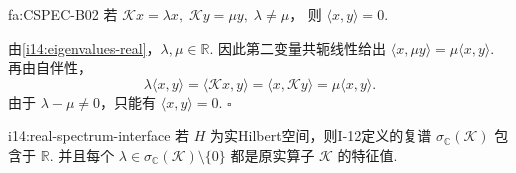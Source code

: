 \begin{FATheorem}[B][紧自伴特征向量正交性]{fa:CSPEC-B02}
若
\(\displaystyle \mathcal Kx=\lambda x, \; \mathcal Ky=\mu y, \; \lambda\neq\mu\)，
则 \(\displaystyle \langle x,y\rangle=0\).
\end{FATheorem}

\begin{FAProof}
由\autoref{i14:eigenvalues-real}，\(\displaystyle \lambda,\mu\in\mathbb R\). 因此第二变量共轭线性给出 \(\displaystyle \langle x,\mu y\rangle=\mu\langle x,y\rangle\). 再由自伴性，
\[
\lambda\langle x,y\rangle
=
\langle\mathcal Kx,y\rangle
=
\langle x,\mathcal Ky\rangle
=
\mu\langle x,y\rangle.
\]
由于 \(\displaystyle \lambda-\mu\neq0\)，只能有 \(\displaystyle \langle x,y\rangle=0\).
\hfill\(\square\)
\end{FAProof}

\begin{FALemma}[C][实Hilbert空间的复谱接口]{i14:real-spectrum-interface}
若 \(\displaystyle H\) 为实Hilbert空间，则I-12定义的复谱 \(\displaystyle \sigma_{\mathbb C}(\mathcal K)\) 包含于 \(\displaystyle \mathbb R\). 并且每个 \(\displaystyle \lambda\in\sigma_{\mathbb C}(\mathcal K)\setminus\{0\}\) 都是原实算子 \(\displaystyle \mathcal K\) 的特征值.
\end{FALemma}

